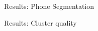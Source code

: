 \documentclass[final]{beamer}
\newcommand{\nonparallel}[1]{\textcolor{tablue20orange}{#1}}
\newcommand{\tablecaptionsep}{\vspace*{-0pt}}
\begin{document}
\begin{frame}[t]
\begin{columns}[T]
\begin{column}{.33\linewidth}
\begin{minipage}[T]{.97\textwidth}
{\begin{block}{Results: Phone Segmentation}

\end{block}

\begin{block}{Results: Cluster quality}

    

\end{block}}
\end{minipage}
\end{column}
\end{columns}
\end{frame}
\end{document}
